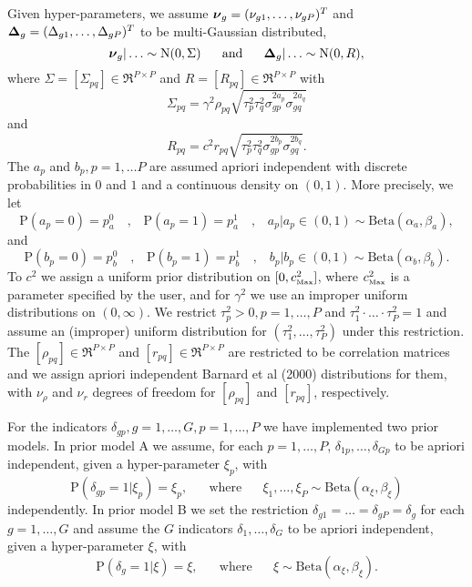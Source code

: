 \documentclass[11pt]{article}
\newcommand{\bDelta}{\mbox{\boldmath $\Delta$}}
\newcommand{\bnu}{\mbox{\boldmath $\nu$}}
\begin{document}
Given hyper-parameters, we assume $\bnu_g = (\nu_{g1},\ldots,\nu_{gP})^T$ and 
$\bDelta_g = (\Delta_{g1},\ldots,\Delta_{gP})^T$ to be multi-Gaussian distributed,
\begin{equation}
\bnu_g |\ldots \sim \mbox{N}(0,\Sigma) \mbox{~~~~~and~~~~~}
\bDelta_g |\ldots \sim \mbox{N}(0,R),
\end{equation}
where $\Sigma = [\Sigma_{pq}]\in\Re^{P\times P}$ and
$R = [R_{pq}]\in\Re^{P\times P}$ with
\begin{equation}\label{Sigma}
\Sigma_{pq} = \gamma^2 \rho_{pq} \sqrt{ \tau_p^2 \tau_q^2 \sigma_{gp}^{2a_p} 
\sigma_{gq}^{2a_q}}
\end{equation}
and
\begin{equation}
R_{pq} = c^2 r_{pq} \sqrt{\tau_p^2 \tau_q^2 \sigma_{gp}^{2b_p}
\sigma_{gq}^{2b_q}}.
\end{equation}
The $a_p$ and $b_p, p=1,\ldots P$ are assumed apriori 
independent with discrete probabilities in $0$ and $1$ and a continuous density on $(0,1)$.
More precisely, we let
\begin{equation}
\mbox{P}(a_p = 0) = p_a^0 \mbox{~~~,~~~} \mbox{P}(a_p = 1) = p_a^1 \mbox{~~~,~~~}
a_p | a_p \in (0,1) \sim \mbox{Beta}(\alpha_a,\beta_a),
\end{equation}
and
\begin{equation}
\mbox{P}(b_p = 0) = p_b^0 \mbox{~~~,~~~} \mbox{P}(b_p = 1) = p_b^1 \mbox{~~~,~~~}
b_p | b_p \in (0,1) \sim \mbox{Beta}(\alpha_b,\beta_b).
\end{equation}
To $c^2$ we assign a uniform prior distribution on 
$[0,c^2_{\mbox{\tiny Max}}]$, where $c^2_{\mbox{\tiny Max}}$ is a parameter 
specified by the user, and for $\gamma^2$ we use an 
improper uniform distributions on $(0,\infty)$.
We restrict $\tau^2_p>0,p=1,\ldots,P$ and 
$\tau_1^2 \cdot \ldots \cdot \tau_P^2 = 1$ and assume an (improper) uniform 
distribution for $(\tau_1^2,\ldots,\tau_P^2)$ under this restriction.
The $[\rho_{pq}] \in \Re^{P\times P}$ and $[r_{pq}] \in \Re^{P\times P}$ are restricted to be 
correlation matrices and we assign apriori independent Barnard et al (2000) distributions for them,
with $\nu_\rho$ and $\nu_r$ degrees of freedom for $[\rho_{pq}]$ and $[r_{pq}]$, respectively.

For the indicators $\delta_{gp},g=1,\ldots,G,p=1,\ldots,P$ we have implemented two prior models. In prior model A
we assume, for each $p=1,\ldots,P$, $\delta_{1p},\ldots,\delta_{Gp}$ to be apriori independent,
given a hyper-parameter $\xi_p$, with
\begin{equation}
\mbox{P}(\delta_{gp}=1|\xi_p) = \xi_p, \mbox{~~~~~where~~~~~}
\xi_1,\ldots,\xi_P\sim\mbox{Beta}(\alpha_\xi,\beta_\xi)\end{equation}
independently.
In prior model B we set the restriction $\delta_{g1}=\ldots=\delta_{gP} = \delta_g$ for each 
$g=1,\ldots,G$ and assume the $G$ indicators $\delta_1,\ldots,\delta_G$ to be apriori independent, given a 
hyper-parameter $\xi$, with
\begin{equation}
\mbox{P}(\delta_g = 1 | \xi ) = \xi, \mbox{~~~~~where~~~~~}
\xi \sim \mbox{Beta}(\alpha_\xi,\beta_\xi).
\end{equation}
\end{document}
